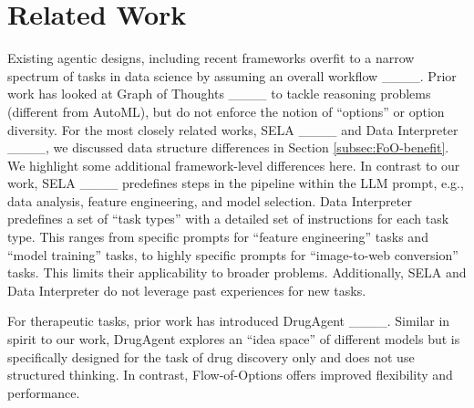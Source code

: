 \section{Related Work}
Existing agentic designs, including recent frameworks overfit to a narrow spectrum of tasks in data science by assuming an overall workflow ____. Prior work has looked at Graph of Thoughts ____ to tackle reasoning problems (different from AutoML), but do not enforce the notion of ``options'' or option diversity. For the most closely related works, SELA ____ and Data Interpreter ____, we discussed data structure differences in Section \ref{subsec:FoO-benefit}. We highlight some additional framework-level differences here. 
In contrast to our work, SELA ____ predefines steps in the pipeline within the LLM prompt, e.g., data analysis, feature engineering, and model selection. Data Interpreter predefines a set of ``task types'' with a detailed set of instructions for each task type. This ranges from specific prompts for ``feature engineering'' tasks and ``model training'' tasks, to highly specific prompts for ``image-to-web conversion'' tasks. This limits their applicability to broader problems. Additionally, SELA and Data Interpreter do not leverage past experiences for new tasks. 

For therapeutic tasks, prior work has introduced DrugAgent ____. Similar in spirit to our work, DrugAgent explores an ``idea space'' of different models but is specifically designed for the task of drug discovery only and does not use structured thinking. In contrast, Flow-of-Options offers improved flexibility and performance.